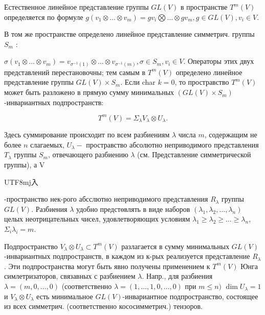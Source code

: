 \documentclass[10pt]{article}
\begin{document}
Естественное линейное представление группы $G L(V)$ в пространстве $T^{m}(V)$ определяется по формуле $g\left(v_{1} \otimes \ldots \otimes v_{m}\right)=g v_{i} \bigotimes \ldots \otimes g v_{m}, g \in G L(V), v_{i} \in V$.



В том же пространстве определено линейное представление симметрич. группы $S_{m}$ :



$\sigma\left(v_{1} \otimes \ldots \otimes v_{m}\right)=v_{\sigma^{-1}(1)} \otimes \ldots \otimes v_{\sigma^{-1}(m)}, \sigma \in S_{m}, v_{i} \in V$. Операторы этих двух представлений перестановочны; тем самым в $T^{m}(V)$ определено линейное представление группы $G L(V) \times S_{m}$. Если char $k=0$, то простравство $T^{m}(V)$ может быть разложено в прямую сумму минимальных $\left(G L(V) \times S_{m}\right)$-инвариантных подпространств:



\[

T^{m}(V)=\Sigma_{\lambda} V_{\lambda} \otimes U_{\lambda} .

\]



Здесь суммирование происходит по всем разбиениям $\lambda$ числа $m$, содержащим не более $n$ слагаемых, $U_{\lambda}-$ простравство абсолютно неприводимого представления $T_{\lambda}$ группы $S_{m}$, отвечающего разбиению $\lambda$ (см. Представление симметрической группы), а V\begin{CJK}{UTF8}{mj}入\end{CJK}-пространство нек-рого абсслютно неприводимого представления $R_{\lambda}$ группы $G L(V)$. Разбиения $\lambda$ удобно предстөвлять в виде наборов $\left(\lambda_{1}, \lambda_{2}, \ldots, \lambda_{n}\right)$ целых неотрицательных чисел, удовлетворяющих условиям $\lambda_{1} \geqslant \lambda_{2} \geqslant \ldots \geqslant \lambda_{n}$, $\Sigma_{i} \lambda_{i}=m$.



Подпространство $V_{\lambda} \otimes U_{\lambda} \subset T^{m}(V)$ разлагается в сумму минимальных $G L(V)$-инвариантных подпространств, в каждом из к-рых реализуется представление $R_{\lambda}$. Эти подпространства могут быть явно получены применением к $T^{m}(V)$ Юнга симлетризаторов, связавных с разбиением $\lambda$. Напр., для разбиения $\lambda=(m, 0, \ldots, 0)$ (соответственно $\lambda=(1, \ldots, 1,0, \ldots, 0)$ при $m \leqslant n)$ $\operatorname{dim} U_{\lambda}=1$ и $V_{\lambda} \otimes U_{\lambda}$ есть минимальное $G L(V)$-инвариантное подпространство, состоящее из всех симметрич. (соответственно кососимметрич.) тензоров.
\end{document}
